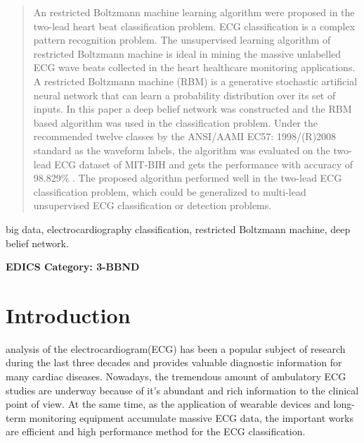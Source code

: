 \documentclass[conference]{IEEEtran}
\begin{document}
\maketitle

\begin{abstract}
An restricted Boltzmann machine learning algorithm were proposed in the two-lead heart beat classification problem.
ECG classification is a complex pattern recognition problem. The unsupervised learning algorithm of restricted Boltzmann machine is ideal in mining the massive unlabelled ECG wave beats collected in the heart healthcare monitoring applications.
A restricted Boltzmann machine (RBM) is a generative stochastic artificial neural network that can learn a probability distribution over its set of inputs.
In this paper a deep belief network was constructed and the RBM based algorithm was used in the classification problem.
Under the recommended twelve classes  by the ANSI/AAMI EC57: 1998/(R)2008 standard as the waveform labels, the algorithm was evaluated on the two-lead ECG dataset of MIT-BIH and gets the performance with accuracy of 98.829\% . The proposed algorithm performed well in the two-lead ECG classification problem, which could be generalized to multi-lead unsupervised ECG classification or detection problems.
\end{abstract}

\begin{IEEEkeywords}
big data, electrocardiography classification, restricted Boltzmann machine, deep belief network.
\end{IEEEkeywords}

 \ifCLASSOPTIONpeerreview
 \begin{center} \bfseries EDICS Category: 3-BBND \end{center}
 \fi
%
\IEEEpeerreviewmaketitle



\section{Introduction}

 analysis of the electrocardiogram(ECG) has been a popular subject of research during the last three decades and provides valuable diagnostic information for many cardiac diseases. Nowadays, the tremendous amount of ambulatory ECG studies are underway because of it's abundant and rich information to the clinical point of view. At the same time, as the application of wearable devices and long-term monitoring equipment accumulate massive ECG data,  the important works are efficient and high performance method for the ECG classification.
\end{document}

